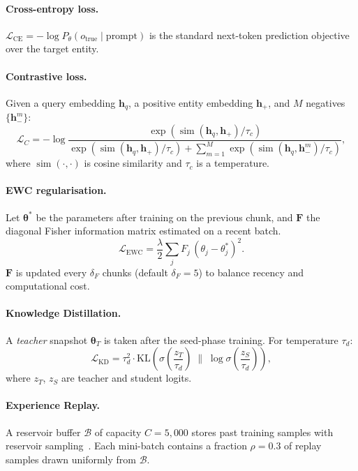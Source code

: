 \documentclass[10pt,twocolumn]{article}
\theoremstyle{definition}
\newcommand{\bfh}{\mathbf{h}}
\newcommand{\bftheta}{\bm{\theta}}
\newcommand{\calB}{\mathcal{B}}
\newcommand{\calL}{\mathcal{L}}
\begin{document}
\paragraph{Cross-entropy loss.}
$\calL_{\text{CE}} = -\log P_\theta(o_{\text{true}} \mid \text{prompt})$
is the standard next-token prediction objective over the target entity.

\paragraph{Contrastive loss.}
Given a query embedding $\bfh_q$, a positive entity embedding
$\bfh_+$, and $M$ negatives $\{\bfh_-^m\}$:
\begin{equation}
  \calL_C = -\log\frac{
    \exp(\operatorname{sim}(\bfh_q, \bfh_+)/\tau_c)}{
    \exp(\operatorname{sim}(\bfh_q, \bfh_+)/\tau_c)
    + \sum_{m=1}^M \exp(\operatorname{sim}(\bfh_q, \bfh_-^m)/\tau_c)},
\end{equation}
where $\operatorname{sim}(\cdot,\cdot)$ is cosine similarity and
$\tau_c$ is a temperature.

\paragraph{EWC regularisation.}
Let $\bftheta^*$ be the parameters after training on the previous chunk, and
$\bm{F}$ the diagonal Fisher information matrix estimated on a recent batch.
\begin{equation}
  \calL_{\text{EWC}} = \frac{\lambda}{2}
    \sum_j F_j\,(\theta_j - \theta^*_j)^2.
  \label{eq:ewc}
\end{equation}
$\bm{F}$ is updated every $\delta_F$ chunks (default $\delta_F = 5$) to
balance recency and computational cost.

\paragraph{Knowledge Distillation.}
A \emph{teacher} snapshot $\bftheta_T$ is taken after the seed-phase training.
For temperature $\tau_d$:
\begin{equation}
  \calL_{\text{KD}} = \tau_d^2 \cdot
    \text{KL}\!\left(
      \sigma\!\left(\frac{z_T}{\tau_d}\right) \;\Big\|\;
      \log\sigma\!\left(\frac{z_S}{\tau_d}\right)
    \right),
  \label{eq:kd}
\end{equation}
where $z_T$, $z_S$ are teacher and student logits.

\paragraph{Experience Replay.}
A reservoir buffer $\calB$ of capacity $C = 5{,}000$ stores past training
samples with reservoir sampling~\citep{Vitter1985reservoir}.
Each mini-batch contains a fraction $\rho = 0.3$ of replay samples drawn
uniformly from $\calB$.
\end{document}
